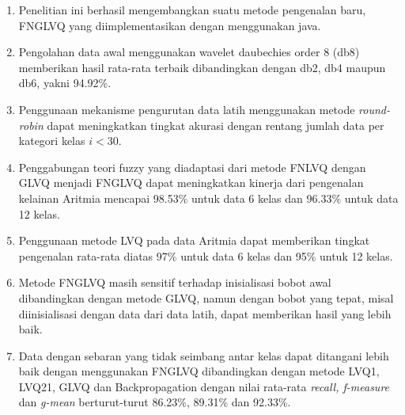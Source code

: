 \begin{enumerate}
  \item Penelitian ini berhasil mengembangkan suatu metode pengenalan baru,
  FNGLVQ yang diimplementasikan dengan menggunakan java.

  \item Pengolahan data awal menggunakan wavelet daubechies order 8 (db8)
  memberikan hasil rata-rata terbaik dibandingkan dengan db2, db4 maupun
  db6, yakni 94.92\%. 

  \item Penggunaan mekanisme pengurutan data latih menggunakan metode
  \emph{round-robin} dapat meningkatkan tingkat akurasi dengan rentang jumlah
  data per kategori kelas $i < 30$.

  \item Penggabungan teori fuzzy yang diadaptasi dari metode FNLVQ dengan
  GLVQ menjadi FNGLVQ dapat meningkatkan kinerja dari pengenalan kelainan
  Aritmia mencapai 98.53\% untuk data 6 kelas dan 96.33\% untuk data 12
  kelas.

  \item Penggunaan metode LVQ pada data Aritmia dapat memberikan tingkat
  pengenalan rata-rata diatas 97\% untuk data 6 kelas dan 95\%
  untuk 12 kelas.


  \item Metode FNGLVQ masih sensitif terhadap inisialisasi bobot awal
  dibandingkan dengan metode GLVQ, namun dengan bobot yang tepat, misal
  diinisialisasi dengan data dari data latih, dapat memberikan hasil yang
  lebih baik.

  \item Data dengan sebaran yang tidak seimbang antar kelas dapat ditangani
  lebih baik dengan menggunakan FNGLVQ dibandingkan dengan metode LVQ1, LVQ21,
  GLVQ dan Backpropagation dengan nilai rata-rata \emph{recall, f-measure} dan
  \emph{g-mean} berturut-turut 86.23\%, 89.31\% dan 92.33\%.
\end{enumerate}

